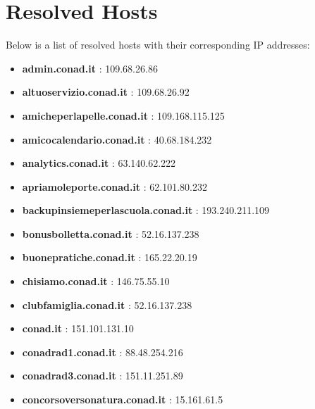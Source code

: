 \documentclass{article}
\begin{document}
\section*{Resolved Hosts}

Below is a list of resolved hosts with their corresponding IP addresses:

\begin{itemize}
    
        \item \textbf{ admin.conad.it }: 109.68.26.86
    
        \item \textbf{ altuoservizio.conad.it }: 109.68.26.92
    
        \item \textbf{ amicheperlapelle.conad.it }: 109.168.115.125
    
        \item \textbf{ amicocalendario.conad.it }: 40.68.184.232
    
        \item \textbf{ analytics.conad.it }: 63.140.62.222
    
        \item \textbf{ apriamoleporte.conad.it }: 62.101.80.232
    
        \item \textbf{ backupinsiemeperlascuola.conad.it }: 193.240.211.109
    
        \item \textbf{ bonusbolletta.conad.it }: 52.16.137.238
    
        \item \textbf{ buonepratiche.conad.it }: 165.22.20.19
    
        \item \textbf{ chisiamo.conad.it }: 146.75.55.10
    
        \item \textbf{ clubfamiglia.conad.it }: 52.16.137.238
    
        \item \textbf{ conad.it }: 151.101.131.10
    
        \item \textbf{ conadrad1.conad.it }: 88.48.254.216
    
        \item \textbf{ conadrad3.conad.it }: 151.11.251.89
    
        \item \textbf{ concorsoversonatura.conad.it }: 15.161.61.5
    

\end{itemize}
\end{document}
